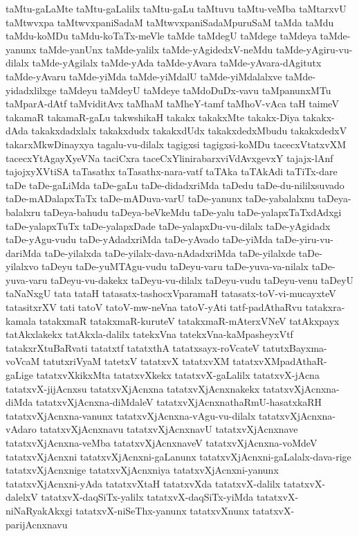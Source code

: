 {taMtu-gaLaMte
taMtu-gaLalilx
taMtu-gaLu
taMtuvu
taMtu-veMba
taMtarxvU
taMtwvxpa
taMtwvxpaniSadaM
taMtwvxpaniSadaMpuruSaM
taMda
taMdu
taMdu-koMDu
taMdu-koTaTx-meVle
taMde
taMdegU
taMdege
taMdeya
taMde-yanunx
taMde-yanUnx
taMde-yalilx
taMde-yAgidedxV-neMdu
taMde-yAgiru-vu-dilalx
taMde-yAgilalx
taMde-yAda
taMde-yAvara
taMde-yAvara-dAgitutx
taMde-yAvaru
taMde-yiMda
taMde-yiMdalU
taMde-yiMdalalxve
taMde-yidadxlilxge
taMdeyu
taMdeyU
taMdeye
taMdoDuDx-vavu
taMpanunxMTu
taMparA-dAtf
taMviditAvx
taMhaM
taMheY-tamf
taMhoV-vAca
taH
taimeV
takamaR
takamaR-gaLu
takwshikaH
takakx
takakxMte
takakx-Diya
takakx-dAda
takakxdadxlalx
takakxdudx
takakxdUdx
takakxdedxMbudu
takakxdedxV
takarxMkwDinayxya
tagalu-vu-dilalx
tagigxsi
tagigxsi-koMDu
tacecxVtatxvXM
tacecxYtAgayXyeVNa
taciCxra
taceCxYlinirabarxviVdAvxgevxY
tajajx-lAnf
tajojxyXVtiSA
taTasathx
taTasathx-nara-vatf
taTAka
taTAkAdi
taTiTx-dare
taDe
taDe-gaLiMda
taDe-gaLu
taDe-didadxriMda
taDedu
taDe-du-nililxsuvado
taDe-mADalapxTaTx
taDe-mADuva-varU
taDe-yanunx
taDe-yabalalxnu
taDeya-balalxru
taDeya-bahudu
taDeya-beVkeMdu
taDe-yalu
taDe-yalapxTaTxdAdxgi
taDe-yalapxTuTx
taDe-yalapxDade
taDe-yalapxDu-vu-dilalx
taDe-yAgidadx
taDe-yAgu-vudu
taDe-yAdadxriMda
taDe-yAvado
taDe-yiMda
taDe-yiru-vu-dariMda
taDe-yilalxda
taDe-yilalx-dava-nAdadxriMda
taDe-yilalxde
taDe-yilalxvo
taDeyu
taDe-yuMTAgu-vudu
taDeyu-varu
taDe-yuva-va-nilalx
taDe-yuva-varu
taDeyu-vu-dakekx
taDeyu-vu-dilalx
taDeyu-vudu
taDeyu-venu
taDeyU
taNaNxgU
tata
tataH
tatasatx-tashocxVparamaH
tatasatx-toV-vi-mucayxteV
tatasitxrXV
tati
tatoV
tatoV-mw-neVna
tatoV-yAti
tatf-padAthaRvu
tatakxra-kamala
tatakxmaR
tatakxmaR-kuruteV
tatakxmaR-mAterxVNeV
tatAkxpayx
tatAkxlakekx
tatAkxla-dalilx
tatekxVna
tatekxVna-kaMpasheyxVtf
tatakxrXtuBaRvati
tatatxtf
tatatxthA
tatatxsayx-roVcateV
tatutxBayxma-voVcaM
tatutxriVyaM
tatetxV
tatatxvX
tatatxvXM
tatatxvXMpadAthaR-gaLige
tatatxvXkikxMta
tatatxvXkekx
tatatxvX-gaLalilx
tatatxvX-jAcna
tatatxvX-jijAcnxsu
tatatxvXjAcnxna
tatatxvXjAcnxnakekx
tatatxvXjAcnxna-diMda
tatatxvXjAcnxna-diMdaleV
tatatxvXjAcnxnathaRmU-hasatxkaRH
tatatxvXjAcnxna-vanunx
tatatxvXjAcnxna-vAgu-vu-dilalx
tatatxvXjAcnxna-vAdaro
tatatxvXjAcnxnavu
tatatxvXjAcnxnavU
tatatxvXjAcnxnave
tatatxvXjAcnxna-veMba
tatatxvXjAcnxnaveV
tatatxvXjAcnxna-voMdeV
tatatxvXjAcnxni
tatatxvXjAcnxni-gaLanunx
tatatxvXjAcnxni-gaLalalx-dava-rige
tatatxvXjAcnxnige
tatatxvXjAcnxniya
tatatxvXjAcnxni-yanunx
tatatxvXjAcnxni-yAda
tatatxvXtaH
tatatxvXda
tatatxvX-dalilx
tatatxvX-dalelxV
tatatxvX-daqSiTx-yalilx
tatatxvX-daqSiTx-yiMda
tatatxvX-niNaRyakAkxgi
tatatxvX-niSeThx-yanunx
tatatxvXnunx
tatatxvX-parijAcnxnavu
}
